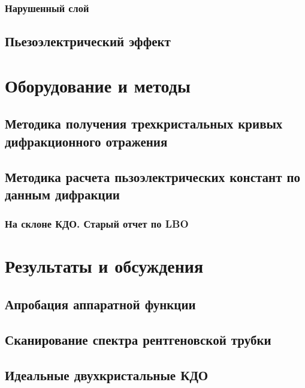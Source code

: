 \documentclass[pdftex,a4paper,14pt,english,russian]{extarticle}
\numberwithin{equation}{subsection}
\begin{document}
    \subsubsection{Нарушенный слой}
      
  \subsection{Пьезоэлектрический эффект}
    

\newpage
\section{Оборудование и методы}
  
  
  
  \subsection{Методика получения трехкристальных кривых дифракционного отражения}
    
    
  \subsection{Методика расчета пьзоэлектрических констант по данным дифракции}
    
  \subsubsection{На склоне КДО. Старый отчет по LBO}
    


\newpage
\section{Результаты и обсуждения}
  \subsection{Апробация аппаратной функции}
    
  \subsection{Сканирование спектра рентгеновской трубки}
      
  \subsection{Идеальные двухкристальные КДО}
    
    
    
\end{document}
